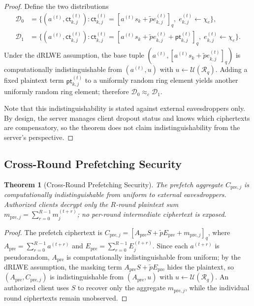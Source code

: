 \documentclass[a4paper,11pt]{article}
\newtheorem{theorem}{Theorem}
\begin{document}
\begin{proof}
Define the two distributions
\begin{align*}
    \mathcal{D}_0 &= \bigl\{ (a^{(t)}, \mathsf{ct}_{k,j}^{(t)}) :
        \mathsf{ct}_{k,j}^{(t)} = [a^{(t)} s_k + \tilde{p} e_{k,j}^{(t)}]_q,\;
        e_{k,j}^{(t)} \leftarrow \chi_e \bigr\}, \\
    \mathcal{D}_1 &= \bigl\{ (a^{(t)}, \mathsf{ct}_{k,j}^{(t)}) :
        \mathsf{ct}_{k,j}^{(t)} = [a^{(t)} s_k + \tilde{p} e_{k,j}^{(t)} + \mathsf{pt}_{k,j}^{(t)}]_q,\;
        e_{k,j}^{(t)} \leftarrow \chi_e \bigr\}.
\end{align*}
Under the dRLWE assumption, the base tuple $(a^{(t)}, [a^{(t)} s_k + \tilde{p} e_{k,j}^{(t)}]_q)$ is computationally indistinguishable from $(a^{(t)}, u)$ with $u \leftarrow \mathcal{U}(\mathcal{R}_q)$. Adding a fixed plaintext term $\mathsf{pt}_{k,j}^{(t)}$ to a uniformly random ring element yields another uniformly random ring element; therefore $\mathcal{D}_0 \approx_c \mathcal{D}_1$.

Note that this indistinguishability is stated against external eavesdroppers only. By design, the server manages client dropout status and knows which ciphertexts are compensatory, so the theorem does not claim indistinguishability from the server's perspective.
\end{proof}

\subsection{Cross-Round Prefetching Security}
\label{ssec:prefetch}

\begin{theorem}[Cross-Round Prefetching Security]
\label{thm:prefetch-security}
The prefetch aggregate $C_{\mathrm{pre},j}$ is computationally indistinguishable from uniform to external eavesdroppers. Authorized clients decrypt only the $R$-round plaintext sum $m_{\mathrm{pre},j} = \sum_{r=0}^{R-1} m_j^{(t+r)}$; no per-round intermediate ciphertext is exposed.
\end{theorem}

\begin{proof}
The prefetch ciphertext is $C_{\mathrm{pre},j} = [A_{\mathrm{pre}} S + \tilde{p} E_{\mathrm{pre}} + m_{\mathrm{pre},j}]_q$, where $A_{\mathrm{pre}} = \sum_{r=0}^{R-1} a^{(t+r)}$ and $E_{\mathrm{pre}} = \sum_{r=0}^{R-1} E_j^{(t+r)}$. Since each $a^{(t+r)}$ is pseudorandom, $A_{\mathrm{pre}}$ is computationally indistinguishable from uniform; by the dRLWE assumption, the masking term $A_{\mathrm{pre}} S + \tilde{p} E_{\mathrm{pre}}$ hides the plaintext, so $(A_{\mathrm{pre}}, C_{\mathrm{pre},j})$ is indistinguishable from $(A_{\mathrm{pre}}, u)$ with $u \leftarrow \mathcal{U}(\mathcal{R}_q)$. An authorized client uses $S$ to recover only the aggregate $m_{\mathrm{pre},j}$, while the individual round ciphertexts remain unobserved.
\end{proof}
\end{document}
